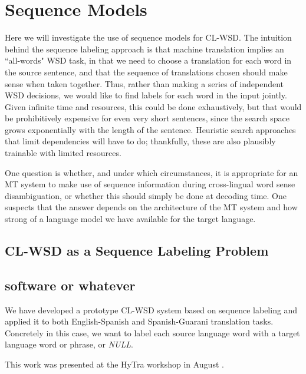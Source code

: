 \chapter{Sequence Models}
\label{chap:sequence}

Here we will investigate the use of sequence models for CL-WSD. The intuition
behind the sequence labeling approach is that machine translation implies an
``all-words" WSD task, in that we need to choose a translation for each word in
the source sentence, and that the sequence of translations chosen should make
sense when taken together. Thus, rather than making a series of independent WSD
decisions, we would like to find labels for each word in the input jointly.
Given infinite time and resources, this could be done exhaustively, but that
would be prohibitively expensive for even very short sentences, since the
search space grows exponentially with the length of the sentence.  Heuristic
search approaches that limit dependencies will have to do; thankfully, these
are also plausibly trainable with limited resources.

One question is whether, and under which circumstances, it is appropriate
for an MT system to make use of sequence information during cross-lingual word
sense disambiguation, or whether this should simply be done at decoding time.
One suspects that the answer depends on the architecture of the MT system and
how strong of a language model we have available for the target language.

\section{CL-WSD as a Sequence Labeling Problem}


\section{software or whatever}
We have developed a prototype CL-WSD system based on sequence labeling and
applied it to both English-Spanish and Spanish-Guarani translation tasks.
Concretely in this case, we want to label each source language word with a
target language word or phrase, or \emph{NULL}.

This work was presented at the HyTra workshop in August
\cite{rudnick-gasser:2013:HyTra-2013}.

